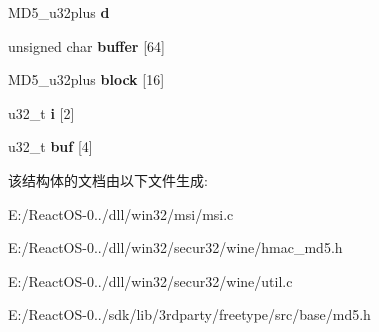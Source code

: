 \begin{DoxyCompactItemize}
\mbox{\label{struct_m_d5___c_t_x_a3b2316dbfcad4bdb1306dc441761f396}} 
M\+D5\+\_\+u32plus {\bfseries d}
\item 
\mbox{\label{struct_m_d5___c_t_x_a2da73ecf544745f58211e998719f367f}} 
unsigned char {\bfseries buffer} \mbox{[}64\mbox{]}
\item 
\mbox{\label{struct_m_d5___c_t_x_a2db62677a153981a205d225b051f0609}} 
M\+D5\+\_\+u32plus {\bfseries block} \mbox{[}16\mbox{]}
\item 
\mbox{\label{struct_m_d5___c_t_x_aa3a2f07e02c5869fa7f67cf22b7847af}} 
u32\+\_\+t {\bfseries i} \mbox{[}2\mbox{]}
\item 
\mbox{\label{struct_m_d5___c_t_x_a34807cc08a3b40a8bc580b29d0c3851e}} 
u32\+\_\+t {\bfseries buf} \mbox{[}4\mbox{]}
\end{DoxyCompactItemize}


该结构体的文档由以下文件生成\+:\begin{DoxyCompactItemize}
\item 
E\+:/\+React\+O\+S-\/0../dll/win32/msi/msi.\+c\item 
E\+:/\+React\+O\+S-\/0../dll/win32/secur32/wine/hmac\+\_\+md5.\+h\item 
E\+:/\+React\+O\+S-\/0../dll/win32/secur32/wine/util.\+c\item 
E\+:/\+React\+O\+S-\/0../sdk/lib/3rdparty/freetype/src/base/md5.\+h\end{DoxyCompactItemize}

